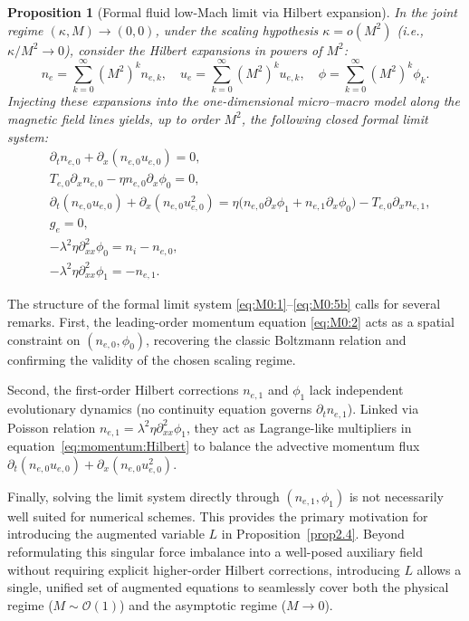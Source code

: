 \documentclass[pdflatex,final,10pt]{article}
\newtheorem{proposition}{Proposition}[section]
\begin{document}
\begin{proposition}[Formal fluid low-Mach limit via Hilbert expansion] \label{prop2.3}
In the joint regime $(\kappa, M) \to (0, 0)$, under the scaling hypothesis $\kappa = o(M^2)$ (i.e., $\kappa / M^2 \to 0$), consider the Hilbert expansions in powers of $M^2$:
\begin{equation} \label{eq:hilbert_expansions}
    n_e = \sum_{k=0}^\infty (M^2)^k n_{e,k}, \quad 
    u_e = \sum_{k=0}^\infty (M^2)^k u_{e,k}, \quad 
    \phi = \sum_{k=0}^\infty (M^2)^k \phi_{k}.
\end{equation}
Injecting these expansions into the one-dimensional micro--macro model along the magnetic field lines yields, up to order $M^2$, the following closed formal limit system:
\begin{align}
        &\partial_t n_{e,0} + \partial_x (n_{e,0} u_{e,0}) = 0, \label{eq:M0:1}\\
        &T_{e,0}\partial_x n_{e,0} - \eta n_{e,0}\partial_x\phi_0 = 0, \label{eq:M0:2}\\
        &\partial_{t}(n_{e,0} u_{e,0})+\partial_{x}(n_{e,0} u_{e,0}^2) = \eta\big( n_{e,0}\partial_x\phi_{1}+n_{e,1}\partial_x\phi_{0}\big)-T_{e,0}\partial_x n_{e,1}, \label{eq:momentum:Hilbert}\\
        &g_e = 0, \label{eq:M0:4}\\
        &-\lambda^2 \eta \partial^2_{xx} \phi_{0} = n_i - n_{e,0}, \label{eq:M0:5a}\\
        &-\lambda^2 \eta \partial^2_{xx} \phi_{1} = - n_{e,1}. \label{eq:M0:5b}
\end{align}
\end{proposition}


The structure of the formal limit system \eqref{eq:M0:1}--\eqref{eq:M0:5b} calls for several remarks. First, the leading-order momentum equation \eqref{eq:M0:2} acts as a spatial constraint on $(n_{e,0}, \phi_0)$, recovering the classic Boltzmann relation and confirming the validity of the chosen scaling regime.

Second, the first-order Hilbert corrections $n_{e,1}$ and $\phi_1$ lack independent evolutionary dynamics (no continuity equation governs $\partial_t n_{e,1}$). Linked via Poisson relation $n_{e,1} = \lambda^2 \eta \partial^2_{xx} \phi_1$, they act as Lagrange-like multipliers in equation~\eqref{eq:momentum:Hilbert} to balance the advective momentum flux $\partial_t (n_{e,0} u_{e,0}) + \partial_x (n_{e,0} u_{e,0}^2)$.

Finally, solving the limit system directly through $(n_{e,1}, \phi_1)$ is not necessarily well suited for numerical schemes. This provides the primary motivation for introducing the augmented variable $L$ in Proposition~\ref{prop2.4}. Beyond reformulating this singular force imbalance into a well-posed auxiliary field without requiring explicit higher-order Hilbert corrections, introducing $L$ allows a single, unified set of augmented equations to seamlessly cover both the physical regime ($M \sim \mathcal{O}(1)$) and the asymptotic regime ($M \to 0$).
\end{document}
